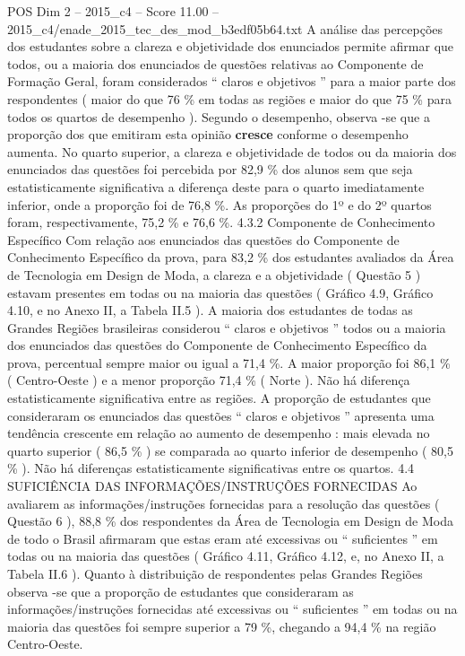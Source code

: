 \begin{textsample}{POS Dim 2 – 2015\_c4 – Score 11.00 – 2015\_c4/enade\_2015\_tec\_des\_mod\_b3edf05b64.txt}
A análise das percepções dos estudantes sobre a clareza e objetividade dos enunciados permite afirmar que todos, ou a maioria dos enunciados de questões relativas ao Componente de Formação Geral, foram considerados “ claros e objetivos ” para a maior parte dos respondentes ( maior do que 76 \% em todas as regiões e maior do que 75 \% para todos os quartos de desempenho ).
Segundo o desempenho, observa -se que a proporção dos que emitiram esta opinião \textbf{cresce} conforme o desempenho aumenta.
No quarto superior, a clareza e objetividade de todos ou da maioria dos enunciados das questões foi percebida por 82,9 \% dos alunos sem que seja estatisticamente significativa a diferença deste para o quarto imediatamente inferior, onde a proporção foi de 76,8 \%.
As proporções do 1º e do 2º quartos foram, respectivamente, 75,2 \% e 76,6 \%. 4.3.2 Componente de Conhecimento Específico Com relação aos enunciados das questões do Componente de Conhecimento Específico da prova, para 83,2 \% dos estudantes avaliados da Área de Tecnologia em Design de Moda, a clareza e a objetividade ( Questão 5 ) estavam presentes em todas ou na maioria das questões ( Gráfico 4.9, Gráfico 4.10, e no Anexo II, a Tabela II.5 ).
A maioria dos estudantes de todas as Grandes Regiões brasileiras considerou “ claros e objetivos ” todos ou a maioria dos enunciados das questões do Componente de Conhecimento Específico da prova, percentual sempre maior ou igual a 71,4 \%.
A maior proporção foi 86,1 \% ( Centro-Oeste ) e a menor proporção 71,4 \% ( Norte ).
Não há diferença estatisticamente significativa entre as regiões.
A proporção de estudantes que consideraram os enunciados das questões “ claros e objetivos ” apresenta uma tendência crescente em relação ao aumento de desempenho : mais elevada no quarto superior ( 86,5 \% ) se comparada ao quarto inferior de desempenho ( 80,5 \% ).
Não há diferenças estatisticamente significativas entre os quartos. 4.4 SUFICIÊNCIA DAS INFORMAÇÕES/INSTRUÇÕES FORNECIDAS Ao avaliarem as informações/instruções fornecidas para a resolução das questões ( Questão 6 ), 88,8 \% dos respondentes da Área de Tecnologia em Design de Moda de todo o Brasil afirmaram que estas eram até excessivas ou “ suficientes ” em todas ou na maioria das questões ( Gráfico 4.11, Gráfico 4.12, e, no Anexo II, a Tabela II.6 ).
Quanto à distribuição de respondentes pelas Grandes Regiões observa -se que a proporção de estudantes que consideraram as informações/instruções fornecidas até excessivas ou “ suficientes ” em todas ou na maioria das questões foi sempre superior a 79 \%, chegando a 94,4 \% na região Centro-Oeste.

\end{textsample}
